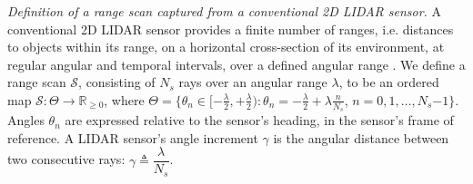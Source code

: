 \begin{definition}
  \label{def:definition_1}
  \textit{Definition of a range scan captured from a conventional 2D LIDAR
  sensor.} A conventional 2D LIDAR sensor provides a finite number of ranges,
  i.e. distances to objects within its range, on a horizontal cross-section of
  its environment, at regular angular and temporal intervals, over a defined
  angular range \cite{lidar}. We define a range scan $\mathcal{S}$, consisting
  of $N_s$ rays over an angular range $\lambda$, to be an ordered map
  $\mathcal{S} : \Theta \rightarrow \mathbb{R}_{\geq 0}$, where $\Theta =
  \{\theta_n \in [-\frac{\lambda}{2}, +\frac{\lambda}{2}) : \theta_n =
  -\frac{\lambda}{2} + \lambda \frac{n}{N_s}$, $n = 0,1,\dots, N_s$$-$$1$$\}$.
  Angles $\theta_n$ are expressed relative to the sensor's heading, in the
  sensor's frame of reference. A LIDAR sensor's angle increment $\gamma$ is the
  angular distance between two consecutive rays: $\gamma \triangleq
  \dfrac{\lambda}{N_s}$.
\end{definition}



